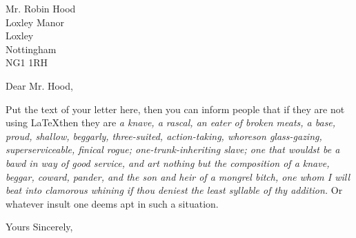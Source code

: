 \documentclass[letter,12pt,a4paper,backaddress=off]{scrlttr2}
\begin{document}
 

\begin{letter}{ 
Mr. Robin Hood
\\Loxley Manor
\\Loxley
\\Nottingham
\\NG1 1RH }


\opening{Dear Mr. Hood,}

\thispagestyle{fancy}

Put the text of your letter here, then you can inform people that if they are not using \LaTeX then they are \emph{a knave, a rascal, an eater of broken meats, a base, proud, shallow, beggarly, three-suited, action-taking, whoreson glass-gazing, superserviceable, finical rogue; one-trunk-inheriting slave; one that wouldst be a bawd in way of good service, and art nothing but the composition of a knave, beggar, coward, pander, and the son and heir of a mongrel bitch, one whom I will beat into clamorous whining if thou deniest the least syllable of thy addition.} Or whatever insult one deems apt in such a situation.

\centering %
\closing{Yours Sincerely,} %

\end{letter} 
\end{document}
